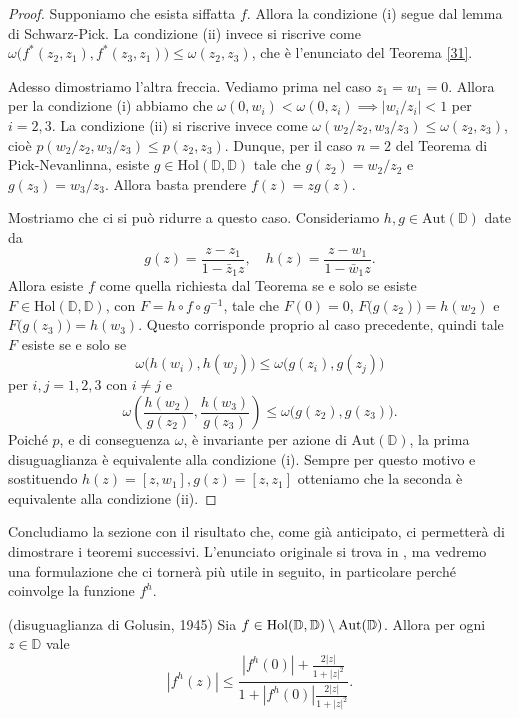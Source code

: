 \begin{proof}
  Supponiamo che esista siffatta $f$. Allora la condizione (i) segue dal lemma di Schwarz-Pick. La condizione (ii) invece si riscrive come $\omega\bigl(f^*(z_2,z_1),f^*(z_3,z_1)\bigr) \le \omega(z_2,z_3)$, che è l'enunciato del Teorema \ref{31}.

  Adesso dimostriamo l'altra freccia. Vediamo prima nel caso $z_1=w_1=0$. Allora per la condizione (i) abbiamo che $\omega(0,w_i) < \omega(0,z_i) \implies |w_i/z_i|<1$ per $i=2,3$. La condizione (ii) si riscrive invece come $\omega(w_2/z_2,w_3/z_3) \le \omega(z_2,z_3)$, cioè $p(w_2/z_2,w_3/z_3) \le p(z_2,z_3)$.
  Dunque, per il caso $n=2$ del Teorema di Pick-Nevanlinna, esiste $g \in \text{Hol}(\mathbb{D},\mathbb{D})$ tale che $g(z_2)=w_2/z_2$ e $g(z_3)=w_3/z_3$. Allora basta prendere $f(z)=zg(z)$.

   Mostriamo che ci si può ridurre a questo caso. Consideriamo $h, g \in \text{Aut}(\mathbb{D})$ date da
   $$g(z)=\frac{z-z_1}{1-\bar{z}_1z}, \quad h(z)=\frac{z-w_1}{1-\bar{w}_1z}.$$
   Allora esiste $f$ come quella richiesta dal Teorema se e solo se esiste $F \in \text{Hol}(\mathbb{D},\mathbb{D})$, con $F=h \circ f \circ g^{-1}$, tale che $F(0)=0$, $F\bigl(g(z_2)\bigr)=h(w_2)$ e $F\bigl(g(z_3)\bigr)=h(w_3)$.
   Questo corrisponde proprio al caso precedente, quindi tale $F$ esiste se e solo se
   $$\omega\bigl(h(w_i),h(w_j)\bigr) \le \omega\bigl(g(z_i),g(z_j)\bigr)$$
   per $i,j=1,2,3$ con $i\not=j$ e
   $$\omega\left(\frac{h(w_2)}{g(z_2)},\frac{h(w_3)}{g(z_3)}\right) \le \omega\bigl(g(z_2),g(z_3)\bigr).$$
   Poiché $p$, e di conseguenza $\omega$, è invariante per azione di $\text{Aut}(\mathbb{D})$, la prima disuguaglianza è equivalente alla condizione (i). Sempre per questo motivo e sostituendo $h(z)=[z,w_1], g(z)=[z,z_1]$ otteniamo che la seconda è equivalente alla condizione (ii).
\end{proof}

Concludiamo la sezione con il risultato che, come già anticipato, ci permetterà di dimostrare i teoremi successivi. L'enunciato originale si trova in \cite{GMG}, ma vedremo una formulazione che ci tornerà più utile in seguito, in particolare perché coinvolge la funzione $f^h$.

\begin{thm} \label{golusin}
  (disuguaglianza di Golusin, 1945) Sia $f \in \text{\normalfont{Hol}}(\mathbb{D},\mathbb{D})\setminus\text{\normalfont{Aut}}(\mathbb{D})$. Allora per ogni $z \in \mathbb{D}$ vale
  \begin{equation} \label{gol}
    |f^h(z)| \le \frac{|f^h(0)|+\frac{2|z|}{1+|z|^2}}{1+|f^h(0)|\frac{2|z|}{1+|z|^2}}.
  \end{equation}
\end{thm}

